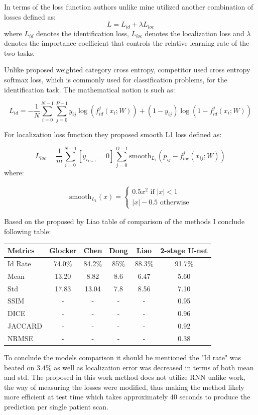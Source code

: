 In terms of the loss function authors unlike mine utilized another combination of losses defined as:
\[L = L_{id} + \lambda L_{loc} \]
where $L_{id}$ denotes the identification loss, $L_{loc}$ denotes the localization loss and $\lambda$ denotes the importance coefficient that controls the relative learning rate of the two tasks. 

Unlike proposed weighted category cross entropy, competitor used  cross entropy softmax loss, which is commonly used for classification problems, for the identification task. The mathematical notion is such as:

\[L_{id}  = - \frac{1}{N} \sum_{i=0}^{N-1}\sum_{j=0}^{P-1} y_{ij} \log (f_{id}^j(x_i; W)) + (1-y_{ij}) \log (1-f_{id}^j(x_i;W)) \]

For localization loss function they proposed smooth L1 loss defined as:

\[ L_{loc} = \frac{1}{m} \sum_{i=0}^{N-1} [y_i_{P-1} = 0] \sum_{j=0}^{D-1} \text{smooth}_L_1 (p_{ij} - f_{loc}^j(x_{ij}; W)) \]
where:

\begin{align*}
\text{smooth}_{L_1}(x) =
\begin{cases}
0.5x^2 \mbox{ if } \lvert x \rvert < 1  \\ 
\lvert x \rvert - 0.5 \mbox{ otherwise} \end{cases}
\end{align*}

Based on the proposed by Liao \cite{Liao2018} table of comparison of the methods I conclude following table:   

\begin{table}[htbp]
\centering
\begin{tabular}{|l|c|c|c|c|c|} \hline\hline
Metrics & Glocker & Chen & Dong & Liao & 2-stage U-net \\ \hline
Id Rate & 74.0\% & 84.2\% & 85\% & 88.3\% & 91.7\% \\
Mean & 13.20 & 8.82 & 8.6 & 6.47 & 5.60 \\
Std & 17.83 & 13.04 & 7.8 & 8.56 & 7.10 \\
SSIM & - & - & - & - & 0.95 \\ 
DICE & - & - & - & - & 0.96\\ 
JACCARD & - & - & - & - & 0.92\\ 
NRMSE & - & - & - & - & 0.38 \\
\hline\hline
\end{tabular}
\end{table}

To conclude the models comparison it should be mentioned the "Id rate" was beated on $3.4$\% as well as localization error was decreased in terms of both mean and std. The proposed in this work method does not utilize RNN unlike \cite{Liao2018} work, the way of measuring the losses were modified, 
thus making the method likely more efficient at test time which takes approximately 40 seconds to produce the prediction per single patient scan. 